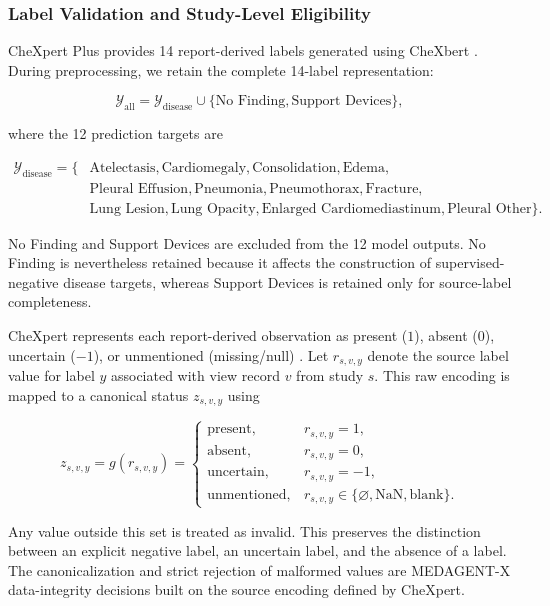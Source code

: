 \subsubsection{Label Validation and Study-Level Eligibility}

CheXpert Plus provides 14 report-derived labels generated using CheXbert \cite{smit2020chexbert,chambon2024chexpertplus}. During preprocessing, we retain the complete 14-label representation:

\[
\mathcal{Y}_{\mathrm{all}}
=
\mathcal{Y}_{\mathrm{disease}}
\cup
\{\text{No Finding},\text{Support Devices}\},
\]

where the 12 prediction targets are

\[
\begin{aligned}
\mathcal{Y}_{\mathrm{disease}}=\{&
\text{Atelectasis},\text{Cardiomegaly},\text{Consolidation},\text{Edema},\\
&\text{Pleural Effusion},\text{Pneumonia},\text{Pneumothorax},\text{Fracture},\\
&\text{Lung Lesion},\text{Lung Opacity},\text{Enlarged Cardiomediastinum},
\text{Pleural Other}\}.
\end{aligned}
\]

No Finding and Support Devices are excluded from the 12 model outputs. No Finding is nevertheless retained because it affects the construction of supervised-negative disease targets, whereas Support Devices is retained only for source-label completeness.

CheXpert represents each report-derived observation as present ($1$), absent ($0$), uncertain ($-1$), or unmentioned (missing/null) \cite{irvin2019chexpert}. Let $r_{s,v,y}$ denote the source label value for label $y$ associated with view record $v$ from study $s$. This raw encoding is mapped to a canonical status $z_{s,v,y}$ using

\[
z_{s,v,y}=g(r_{s,v,y})=
\begin{cases}
\mathrm{present}, & r_{s,v,y}=1,\\
\mathrm{absent}, & r_{s,v,y}=0,\\
\mathrm{uncertain}, & r_{s,v,y}=-1,\\
\mathrm{unmentioned}, & r_{s,v,y}\in\{\varnothing,\mathrm{NaN},\text{blank}\}.
\end{cases}
\]

Any value outside this set is treated as invalid. This preserves the distinction between an explicit negative label, an uncertain label, and the absence of a label. The canonicalization and strict rejection of malformed values are MEDAGENT-X data-integrity decisions built on the source encoding defined by CheXpert.

